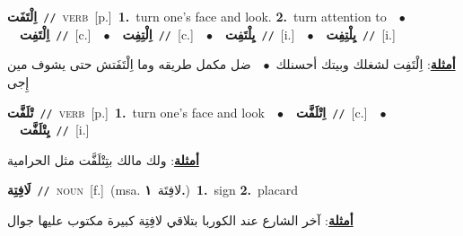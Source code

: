 \documentclass[10pt,a4paper,twoside]{article} %
\begin{document}
\begin{multicols}{2}
{\setlength\topsep{0pt}\textbf{\foreignlanguage{arabic}{اِلْتَفَت}}\ {\color{gray}\texttt{//}\color{black}}\ \textsc{verb}\ [p.]\ \textbf{1.}~turn one's face and look.  \textbf{2.}~turn attention to\ \ $\bullet$\ \ \setlength\topsep{0pt}\textbf{\foreignlanguage{arabic}{اِلْتَفِت}}\ {\color{gray}\texttt{//}\color{black}}\ [c.]\ \ $\bullet$\ \ \setlength\topsep{0pt}\textbf{\foreignlanguage{arabic}{اِلْتِفِت}}\ {\color{gray}\texttt{//}\color{black}}\ [c.]\ \ $\bullet$\ \ \setlength\topsep{0pt}\textbf{\foreignlanguage{arabic}{يِلْتَفِت}}\ {\color{gray}\texttt{//}\color{black}}\ [i.]\ \ $\bullet$\ \ \setlength\topsep{0pt}\textbf{\foreignlanguage{arabic}{يِلْتِفِت}}\ {\color{gray}\texttt{//}\color{black}}\ [i.]\  \begin{flushright}\color{gray}\foreignlanguage{arabic}{\textbf{\underline{\foreignlanguage{arabic}{أمثلة}}}: اِلْتَفِت لشغلك وبيتك أحسنلك\ $\bullet$\ \  ضل مكمل طريقه وما اِلْتَفَتش حتى يشوف مين إِجى}\end{flushright}\color{black}} \vspace{2mm}

{\setlength\topsep{0pt}\textbf{\foreignlanguage{arabic}{تْلَفَّت}}\ {\color{gray}\texttt{//}\color{black}}\ \textsc{verb}\ [p.]\ \textbf{1.}~turn one's face and look\ \ $\bullet$\ \ \setlength\topsep{0pt}\textbf{\foreignlanguage{arabic}{اِتْلَفَّت}}\ {\color{gray}\texttt{//}\color{black}}\ [c.]\ \ $\bullet$\ \ \setlength\topsep{0pt}\textbf{\foreignlanguage{arabic}{يِتْلَفَّت}}\ {\color{gray}\texttt{//}\color{black}}\ [i.]\  \begin{flushright}\color{gray}\foreignlanguage{arabic}{\textbf{\underline{\foreignlanguage{arabic}{أمثلة}}}: ولك مالك بتِتْلَفَّت مثل الحرامية}\end{flushright}\color{black}} \vspace{2mm}

{\setlength\topsep{0pt}\textbf{\foreignlanguage{arabic}{لَافِتِة}}\ {\color{gray}\texttt{//}\color{black}}\ \textsc{noun}\ [f.]\ \color{gray}(msa. \foreignlanguage{arabic}{لافِتَة}~\foreignlanguage{arabic}{\textbf{١.}})\color{black}\ \textbf{1.}~sign  \textbf{2.}~placard\  \begin{flushright}\color{gray}\foreignlanguage{arabic}{\textbf{\underline{\foreignlanguage{arabic}{أمثلة}}}: آخر الشارع عند الكوربا بتلاقي لافِتِة كبيرة مكتوب عليها جوال}\end{flushright}\color{black}} \vspace{2mm}


\end{multicols}
\end{document}
